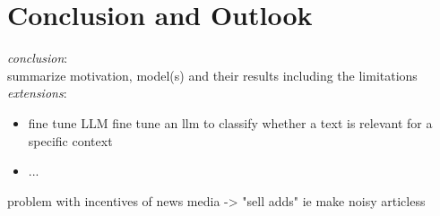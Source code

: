 \chapter{Conclusion and Outlook}\label{sec6}
\thispagestyle{empty}

\textit{conclusion}: \\
summarize motivation, model(s) and their results including the limitations \\

\noindent
\textit{extensions}:
\begin{itemize}
	\item fine tune LLM fine tune an llm to classify whether a text is relevant for a specific context
	\item ...
\end{itemize}

problem with incentives of news media -> "sell adds" ie make noisy articless




\cleardoublepage
